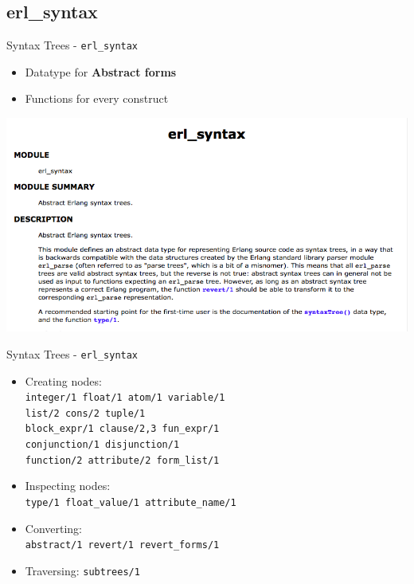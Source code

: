 \documentclass[c]{beamer}
\begin{document}
\subsection{erl\_syntax}

\begin{frame}{Syntax Trees - \texttt{erl\_syntax}}
  \begin{itemize}
  \item Datatype for \textbf{Abstract forms}
  \item Functions for every construct
  \end{itemize}
  \begin{center}
    \includegraphics[width=\textwidth]{erl_syntax.png}
  \end{center}
\end{frame}

\begin{frame}{Syntax Trees - \texttt{erl\_syntax}}
  \begin{itemize}
  \item<1-> Creating nodes: \\
    \texttt{integer/1 float/1 atom/1 variable/1} \\
    \texttt{list/2 cons/2 tuple/1} \\
    \texttt{block\_expr/1 clause/2,3 fun\_expr/1} \\
    \texttt{conjunction/1 disjunction/1} \\
    \texttt{function/2 attribute/2 form\_list/1}
  \item<2-> Inspecting nodes: \\
    \texttt{type/1 float\_value/1 attribute\_name/1}
  \item<3-> Converting: \\
    \texttt{abstract/1 revert/1 revert\_forms/1}
  \item<4> Traversing: \texttt{subtrees/1}
  \end{itemize}
\end{frame}
\end{document}
